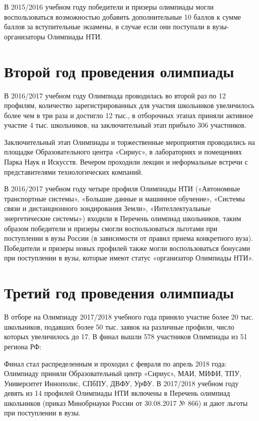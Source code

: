 В 2015/2016 учебном году победители и призеры олимпиады могли воспользоваться возможностью добавить дополнительные 10 баллов к сумме баллов за вступительные экзамены, в случае если они поступали в вузы-организаторы Олимпиады НТИ. 

\section*{Второй год проведения олимпиады}

В 2016/2017 учебном году Олимпиада проводилась во второй раз по 12 профилям, количество зарегистрированных для участия школьников увеличилось более чем в три раза и достигло 12 тыс., в отборочных этапах приняли активное участие 4 тыс. школьников, на заключительный этап прибыло 306 участников.  

Заключительный этап Олимпиады и торжественные мероприятия проводились на площадке Образовательного центра «Сириус», в лабораториях и помещениях Парка Наук и Искусств. Вечером проходили лекции и неформальные встречи с представителями технологических компаний. 

В 2016/2017 учебном году четыре профиля Олимпиады НТИ («Автономные транспортные системы», «Большие данные и машинное обучение», «Системы связи и дистанционного зондирования Земли», «Интеллектуальные энергетические системы») входили в Перечень олимпиад школьников, таким  образом победители и призеры смогли воспользоваться льготами при поступлении в вузы России (в зависимости от правил приема конкретного вуза). Победители и призеры новых профилей также могли воспользоваться бонусами при поступлении в вузы, которые имеют статус «организатор Олимпиады НТИ».

\section*{Третий год проведения олимпиады}

В отборе на Олимпиаду 2017/2018 учебного года приняло участие более 20 тыс. школьников, подавших более 50 тыс. заявок на различные профили, число которых увеличилось до 17. В финал вышли 578 участников Олимпиады из 51 региона РФ:


Финал стал распределенным и проходил с февраля по апрель 2018 года: Олимпиаду приняли Образовательный центр «Сириус», МАИ, МИФИ, ТПУ, Университет Иннополис, СПбПУ, ДВФУ, УрФУ. В 2017/2018 учебном году девять из 14 профилей Олимпиады НТИ включены в Перечень олимпиад школьников (приказ Минобрнауки России от 30.08.2017 № 866) и дают льготы при поступлении в вузы.

